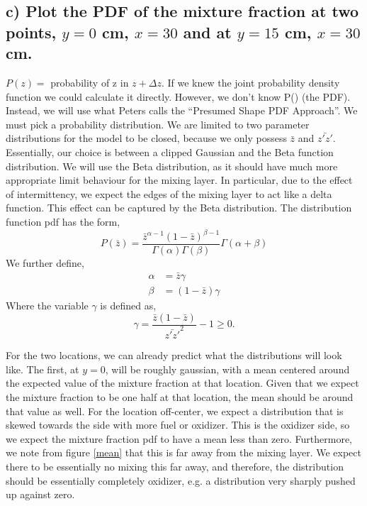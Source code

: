 \documentclass{article}
\begin{document}
\subsection*{c) Plot the PDF of the mixture fraction at two points, $y=0$ cm,
$x=30$ and at $y=15$ cm, $x=30$ cm.}

$P(z) =$ probability of z in $z+\Delta z$. If we knew the joint
probability density function we could calculate it directly. However, we
don't know P() (the PDF). Instead, we will use  what Peters calls the
``Presumed Shape PDF Approach''. We must pick a probability
distribution. We are limited to two parameter distributions for the
model to be closed, because we only possess  $\bar z$ and
$\bar{z'z'}$. Essentially, our choice is between a clipped Gaussian and
the Beta  function distribution. We will use the Beta distribution, as
it should have much more appropriate  limit behaviour for the mixing
layer. In particular, due to the effect of intermittency, we expect the
edges of the mixing layer to act like a delta function. This effect can
be captured by the Beta distribution. The distribution function pdf has
the form,  
\begin{equation}
P(\bar z) = \frac{\bar z^{\alpha-1}(1-\bar z)^{\beta-1}}{\Gamma(\alpha)\Gamma(\beta)}\Gamma(\alpha + \beta)
\end{equation}
We further define,
\begin{align}
\alpha &= \bar z \gamma \\
\beta  &= (1-\bar z) \gamma
\end{align}
Where the variable $\gamma$ is defined as, 
\begin{equation}
  \gamma = \frac{\bar z (1-\bar z)}{\bar{z'z'}^2} -1 \geq 0.
\end{equation}

For the two locations, we can already predict what the distributions
will look like. The first, at $y=0$, will be roughly gaussian, with a
mean centered around the expected value of the mixture fraction at that
location. Given that we expect the mixture fraction to be one half at that
location, the mean should be around that value as well. For the location
off-center, we expect a distribution that is skewed towards the side
with more fuel or oxidizer. This is the oxidizer side, so we expect the
mixture fraction pdf to have a mean less than zero. Furthermore, we note
from figure \ref{mean} that this is far away from the mixing layer. We
expect there to be essentially no mixing this far away, and therefore,
the distribution should be essentially completely oxidizer, e.g. a
distribution very sharply pushed up against zero. 
\end{document}
